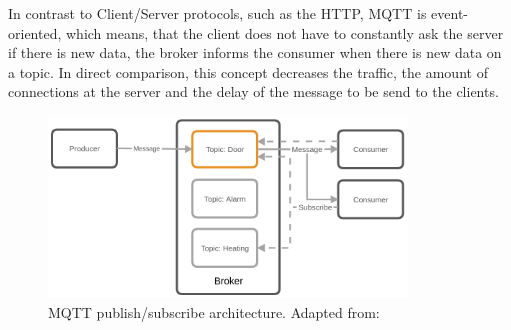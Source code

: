In contrast to Client/Server protocols, such as the \acs{HTTP}, \ac{MQTT} is event-oriented, which means, that the client does not have to constantly ask the server if there is new data, the broker informs the consumer when there is new data on a topic.\autocite[cf.]{Bayer:MQTT}
In direct comparison, this concept decreases the traffic, the amount of connections at the server and the delay of the message to be send to the clients.

\begin{figure}[H]
    \centering
    \includegraphics[width=0.85\textwidth]{resources/images/mqtt_architecture.png}
    \caption[MQTT publish/subscribe architecture]{MQTT publish/subscribe architecture. Adapted from: \autocite{Bayer:MQTT}}
    \label{fig:mqtt_architecture}
\end{figure}

